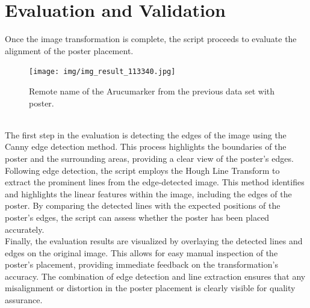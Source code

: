 \documentclass[a4paper,twocolumn]{article}
\begin{document}
\section{Evaluation and Validation}

Once the image transformation is complete, the script proceeds to evaluate the alignment of the poster placement.
\begin{figure}[h!]
    \centering
    \texttt{[image: img/img\_result\_113340.jpg]} %
    \caption{Remote name of the Arucumarker from the previous data set with poster.}
    \label{fig:example-result}
\end{figure}
 \\
 The first step in the evaluation is detecting the edges of the image using the Canny edge detection method. This process highlights the boundaries of the poster and the surrounding areas, providing a clear view of the poster's edges.
Following edge detection, the script employs the Hough Line Transform to extract the prominent lines from the edge-detected image. This method identifies and highlights the linear features within the image, including the edges of the poster. By comparing the detected lines with the expected positions of the poster's edges, the script can assess whether the poster has been placed accurately.
\\
Finally, the evaluation results are visualized by overlaying the detected lines and edges on the original image. This allows for easy manual inspection of the poster’s placement, providing immediate feedback on the transformation’s accuracy. The combination of edge detection and line extraction ensures that any misalignment or distortion in the poster placement is clearly visible for quality assurance.
\end{document}

